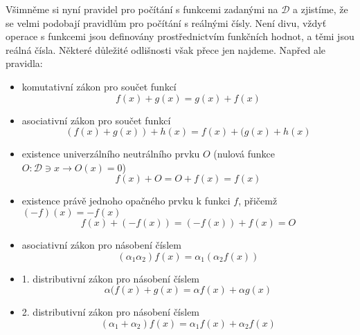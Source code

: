       Všimněme si nyní pravidel pro počítání s funkcemi zadanými na \(\mathcal{D}\) a zjistíme, 
      že se velmi podobají pravidlům pro počítání s reálnými čísly. Není divu, vždyť operace s 
      funkcemi jsou definovány prostřednictvím funkčních hodnot, a těmi jsou reálná čísla. Některé 
      důležité odlišnosti však přece jen najdeme. Napřed ale pravidla:
      
      \begin{itemize}[noitemsep]
        \item komutativní zákon pro součet funkcí
          \begin{equation}\label{mai:eq012}
            f(x) + g(x) = g(x) + f(x)
          \end{equation}
        \item asociativní zákon pro součet funkcí  
          \begin{equation}\label{mai:eq013}
            (f(x) + g(x)) + h(x) = f(x) + (g(x) + h(x)
          \end{equation}
        \item existence univerzálního neutrálního  prvku \(O\) (nulová funkce \(O:\mathcal{D}\ni x 
          \rightarrow O(x)=0\))
          \begin{equation}\label{mai:eq014}
            f(x) + O = O + f(x) = f(x)
          \end{equation}
        \item existence právě jednoho opačného prvku k funkci \(f\), přičemž \((-f)(x) = -f(x)\)
          \begin{equation}\label{mai:eq015}
            f(x)+(-f(x))=(-f(x))+f(x)=O
          \end{equation}
        \item asociativní zákon pro násobení číslem 
         \begin{equation}\label{mai:eq016}
            (\alpha_1\alpha_2)f(x) = \alpha_1(\alpha_2f(x))
         \end{equation}
        \item  1. distributivní zákon pro násobení číslem
          \begin{equation}\label{mai:eq017}
            \alpha(f(x)+g(x) =\alpha f(x) + \alpha g(x)
          \end{equation}\label{mai:eq018}
        \item 2. distributivní zákon pro násobení číslem 
          \begin{equation}\label{mai:eq019}
            (\alpha_1+\alpha_2)f(x) =\alpha_1f(x)+\alpha_2f(x)

\end{equation}
\end{itemize}
